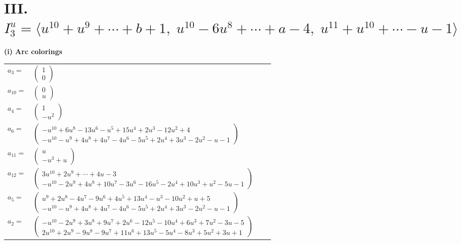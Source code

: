 \documentclass[1p]{elsarticle_modified}
\theoremstyle{definition}
\begin{document}
\centering \section*{III. $I^u_{3}= \langle u^{10}+u^9+\cdots+b+1,\;u^{10}-6 u^8+\cdots+a-4,\;u^{11}+u^{10}+\cdots- u-1 \rangle$}
\flushleft \textbf{(i) Arc colorings}\\
\begin{tabular}{m{7pt} m{180pt} m{7pt} m{180pt} }
\flushright $a_{3}=$&$\begin{pmatrix}1\\0\end{pmatrix}$ \\
\flushright $a_{10}=$&$\begin{pmatrix}0\\u\end{pmatrix}$ \\
\flushright $a_{4}=$&$\begin{pmatrix}1\\- u^2\end{pmatrix}$ \\
\flushright $a_{6}=$&$\begin{pmatrix}- u^{10}+6 u^8-13 u^6- u^5+15 u^4+2 u^3-12 u^2+4\\- u^{10}- u^9+4 u^8+4 u^7-4 u^6-5 u^5+2 u^4+3 u^3-2 u^2- u-1\end{pmatrix}$ \\
\flushright $a_{11}=$&$\begin{pmatrix}u\\- u^3+u\end{pmatrix}$ \\
\flushright $a_{12}=$&$\begin{pmatrix}3 u^{10}+2 u^9+\cdots+4 u-3\\- u^{10}-2 u^9+4 u^8+10 u^7-3 u^6-16 u^5-2 u^4+10 u^3+u^2-5 u-1\end{pmatrix}$ \\
\flushright $a_{5}=$&$\begin{pmatrix}u^9+2 u^8-4 u^7-9 u^6+4 u^5+13 u^4- u^3-10 u^2+u+5\\- u^{10}- u^9+4 u^8+4 u^7-4 u^6-5 u^5+2 u^4+3 u^3-2 u^2- u-1\end{pmatrix}$ \\
\flushright $a_{2}=$&$\begin{pmatrix}- u^{10}-2 u^9+3 u^8+9 u^7+2 u^6-12 u^5-10 u^4+6 u^3+7 u^2-3 u-5\\2 u^{10}+2 u^9-9 u^8-9 u^7+11 u^6+13 u^5-5 u^4-8 u^3+5 u^2+3 u+1\end{pmatrix}$ \\

\end{tabular}
\end{document}

